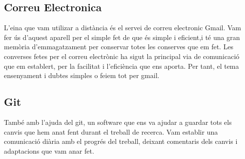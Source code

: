 \subsection{Correu Electronica}
L'eina que vam utilizar a distància és el servei de correu electronic Gmail. Vam fer ús d'aquest aparell per el simple fet de que és simple i eficient,i té una gran memòria d'emmagatzament per conservar totes les conserves que em fet.
Les converses fetes per el correu electrònic ha sigut la principal via de comunicació que em establert, per la facilitat i l'eficiència que ens aporta. Per tant, el tema ensenyament i dubtes simples o feiem tot per gmail.

\subsection{Git}
També amb l'ajuda del git, un software que ens va ajudar a guardar tots els canvis que hem anat fent durant el treball de recerca. Vam  establir una comunicació diària amb el progrés del treball, deixant comentaris dels canvis i adaptacions que vam anar fet.


